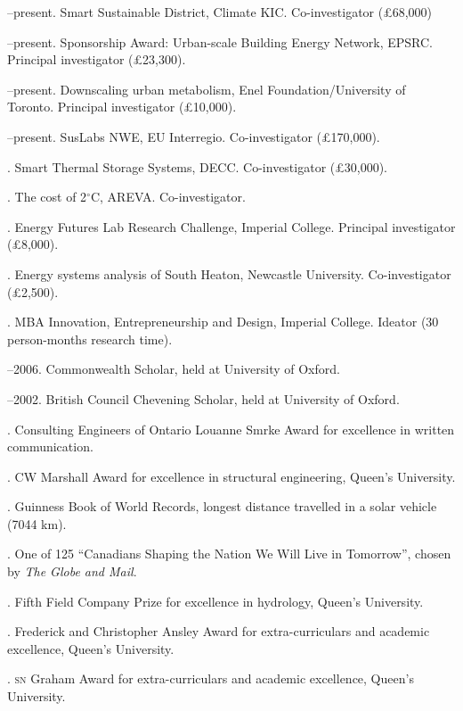 \documentclass[11pt,a4paper]{article}
\begin{document}
--present.  Smart Sustainable District, Climate KIC.  Co-investigator (£68,000)

--present.  Sponsorship Award: Urban-scale Building Energy Network, EPSRC.  Principal investigator (£23,300).

--present. Downscaling urban metabolism, Enel Foundation/University of Toronto. Principal investigator (£10,000).

--present.  SusLabs NWE, EU Interregio.  Co-investigator (£170,000).

. Smart Thermal Storage Systems, DECC.  Co-investigator (£30,000).

. The cost of 2$^\circ$C, AREVA.  Co-investigator.

. Energy Futures Lab Research Challenge, Imperial College.  Principal investigator (£8,000).

. Energy systems analysis of South Heaton, Newcastle University.  Co-investigator (£2,500).

. MBA Innovation, Entrepreneurship and Design, Imperial College.  Ideator (30 person-months research time).

--2006.  Commonwealth Scholar, held at University of Oxford.

--2002.  British Council Chevening Scholar, held at University of Oxford.

.  Consulting Engineers of Ontario Louanne Smrke Award for excellence in written communication.

. CW Marshall Award for excellence in structural engineering, Queen's University.

. Guinness Book of World Records, longest distance travelled in a solar vehicle (7044 km).

. One of 125 ``Canadians Shaping the Nation We Will Live in Tomorrow'', chosen by \emph{The Globe and Mail}.

. Fifth Field Company Prize for excellence in hydrology, Queen's University.

. Frederick and Christopher Ansley Award for extra-curriculars and academic excellence, Queen's University.

. \textsc{sn} Graham Award for extra-curriculars and academic excellence, Queen's University.
\end{document}
